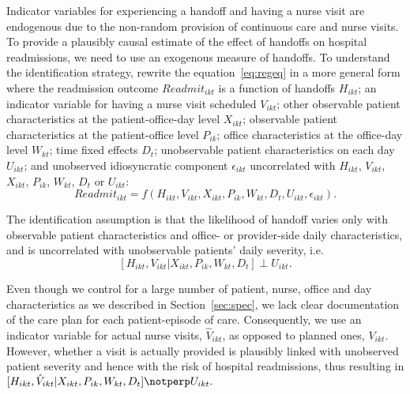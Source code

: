 \documentclass[final,12pt, notitlepage]{article}
\begin{document}
Indicator variables for experiencing a handoff and having a nurse visit are endogenous due to the non-random provision of continuous care and nurse visits. To provide a plausibly causal estimate of the effect of handoffs on hospital readmissions, we need to use an exogenous measure of handoffs. To understand the identification strategy, rewrite the equation~\eqref{eq:regeq} in a more general form where the readmission outcome $Readmit_{ikt}$ is a function of handoffs $H_{ikt}$;
an indicator variable for having a nurse visit scheduled $V_{ikt}$;
other observable patient characteristics at the patient-office-day level $X_{ikt}$;
observable patient characteristics at the patient-office level $P_{ik}$;
office characteristics at the office-day level $W_{kt}$;
time fixed effects $D_t$;
unobservable patient characteristics on each day $U_{ikt}$;%
and unobserved idiosyncratic component $\epsilon_{ikt}$ uncorrelated with $H_{ikt}$, $V_{ikt}$, $X_{ikt}$, $P_{ik}$, $W_{kt}$, $D_t$ or $U_{ikt}$:
\begin{equation}\label{eq:y}
Readmit_{ikt} = f(H_{ikt}, V_{ikt}, X_{ikt}, P_{ik}, W_{kt}, D_t, U_{ikt}, \epsilon_{ikt}).
\end{equation}

The identification assumption is that the likelihood of handoff varies only with observable patient characteristics and office- or provider-side daily characteristics, and is uncorrelated with unobservable patients' daily severity, i.e.
$$[H_{ikt}, V_{ikt} | X_{ikt}, P_{ik}, W_{kt}, D_t] \perp U_{ikt}.$$

Even though we control for a large number of patient, nurse, office and day characteristics as we described in Section~\ref{sec:spec}, we lack clear documentation of the care plan for each patient-episode of care. Consequently, we use an indicator variable for actual nurse visits, $\hat{V}_{ikt}$, as opposed to planned ones, $V_{ikt}$. However, whether a visit is actually provided is plausibly linked with unobserved patient severity and hence with the risk of hospital readmissions, thus resulting in $[H_{ikt}, \hat{V}_{ikt} | X_{ikt}, P_{ik}, W_{kt}, D_t] \notperp U_{ikt}.$
\end{document}
